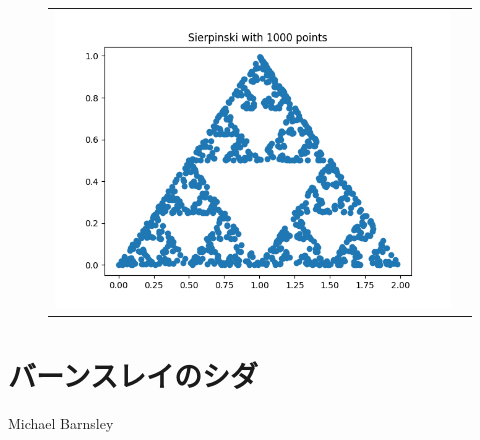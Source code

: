 \documentclass[uplatex,a4paper,11pt,oneside,openany]{jsbook}
\begin{document}
%

\begin{figure}[H]
  \centering
  \begin{tabular}{cc}
      \begin{minipage}{0.9\hsize}
      \centering
\includegraphics[keepaspectratio,clip,scale=0.6]{../src/figure/sierpinski.png}
      \end{minipage}
      \begin{minipage}{0.1\hsize}
      \centering
      \end{minipage}
    \end{tabular}
\end{figure}%

\section{バーンスレイのシダ}

Michael Barnsley


\end{document}
